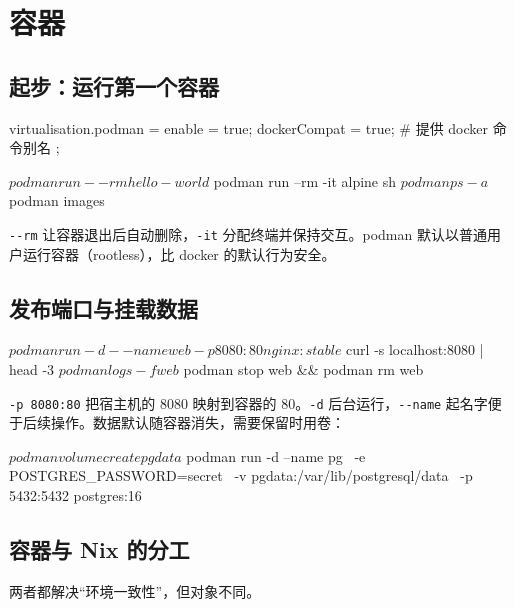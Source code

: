 \chapter{容器}
\label{ch:containers}

\section{起步：运行第一个容器}

\begin{nixcode}
virtualisation.podman = {
  enable = true;
  dockerCompat = true; # 提供 docker 命令别名
};
\end{nixcode}

\begin{shellsession}
$ podman run --rm hello-world
$ podman run --rm -it alpine sh
$ podman ps -a
$ podman images
\end{shellsession}

\texttt{-{}-rm} 让容器退出后自动删除，\texttt{-it} 分配终端并保持交互。podman 默认以普通用户运行容器（rootless），比 docker 的默认行为安全。

\section{发布端口与挂载数据}

\begin{shellsession}
$ podman run -d --name web -p 8080:80 nginx:stable
$ curl -s localhost:8080 | head -3
$ podman logs -f web
$ podman stop web && podman rm web
\end{shellsession}

\texttt{-p 8080:80} 把宿主机的 8080 映射到容器的 80。\texttt{-d} 后台运行，\texttt{-{}-name} 起名字便于后续操作。数据默认随容器消失，需要保留时用卷：

\begin{shellsession}
$ podman volume create pgdata
$ podman run -d --name pg \
    -e POSTGRES_PASSWORD=secret \
    -v pgdata:/var/lib/postgresql/data \
    -p 5432:5432 postgres:16
\end{shellsession}

\section{容器与 Nix 的分工}

两者都解决“环境一致性”，但对象不同。

